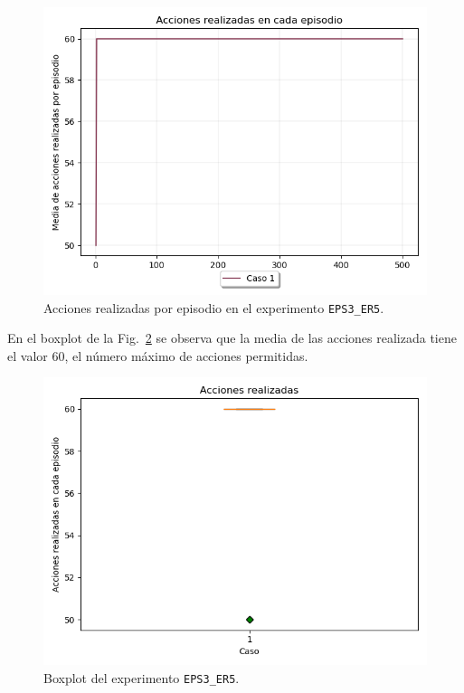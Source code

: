 \begin{figure}
    \centering
    \includegraphics[scale=0.4]{cap5_experimentacion/images/dim5_lr0.01_ep0.4_acciones.png}
    \caption{Acciones realizadas por episodio en el experimento \texttt{EPS3\_ER5}.}
    \label{fig:dim5_lr0.01_ep0.4_acciones}
\end{figure}

En el boxplot de la Fig.~\ref{fig:dim5_lr0.01_ep0.4_boxplot} se observa que la media de las acciones realizada tiene el valor 60, el número máximo de acciones permitidas. \\

\begin{figure}
    \centering
    \includegraphics[scale=0.4]{cap5_experimentacion/images/dim5_lr0.01_ep0.4_boxplot.png}
    \caption{Boxplot del experimento \texttt{EPS3\_ER5}.}
    \label{fig:dim5_lr0.01_ep0.4_boxplot}
\end{figure}

